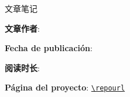
\begin{titlepage}
\centering
{\Large 文章笔记\par}
\vspace{1.2cm}
{\huge\bfseries \notetitle\par}
\vspace{0.8cm}
{\large \noteauthors\par}
\vspace{0.3cm}
{\large \notedate\par}
\vspace{1.2cm}

\vfill
\begin{tcolorbox}[width=0.9\textwidth, colback=black!2!white, colframe=black!60, sharp corners]
\textbf{文章作者}: \videochannel\par
\textbf{Fecha de publicación}: \videopublishdate\par
\textbf{阅读时长}: \videoduration\par
{}
\par
\textbf{Página del proyecto}: \href{\repourl}{\nolinkurl{\repourl}}\par
\end{tcolorbox}
\end{titlepage}

\tableofcontents
\newpage


